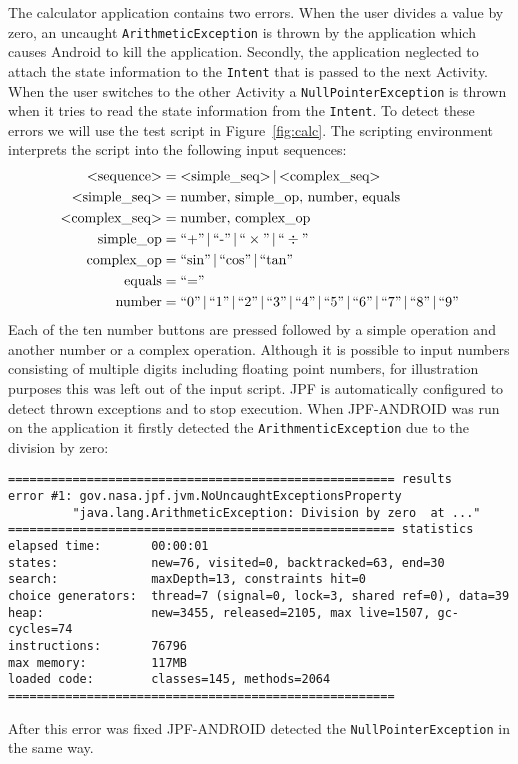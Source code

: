 \documentclass{acm_proc_article-sp}
\begin{document}
The calculator application contains two errors. When the user divides a value by zero, an uncaught
\texttt{ArithmeticException} is thrown by the application which causes Android to kill the application. Secondly, the application neglected
to attach the state information to the \texttt{Intent} that is passed to the next Activity. When the user switches to the other Activity a
\texttt{NullPointerException} is thrown when it tries to read the state information from the \texttt{Intent}. To detect these errors we will use the test script in Figure~\ref{fig:calc}. The scripting environment interprets the script into the
following input sequences:
\begin{align*}
\text{<sequence>} &= \text{<simple\_seq>}\,|\,\text{<complex\_seq>}\\
\text{<simple\_seq>} &= \text{number},\,\text{simple\_op},\,\text{number},\,\text{equals}\\
\text{<complex\_seq>} &= \text{number},\,\text{complex\_op}\\
\text{simple\_op} &= \text{``+''}\,|\,\text{``-''}\,|\,\text{``}\times\text{''}\,|\,\text{``}\div\text{''}\\
\text{complex\_op} &= \text{``sin''}\,|\,\text{``cos''}\,|\,\text{``tan''}\\
\text{equals} &= \text{``=''} \\
\text{number} &= \text{``0''\,|\,``1''\,|\,``2''\,|\,``3''\,|\,``4''\,|\,``5''\,|\,``6''\,|\,``7''\,|\,``8''\,|\,``9''}
\end{align*}
Each of the ten number buttons are pressed followed by a simple operation and another number or a complex operation. Although it is possible
to input numbers consisting of multiple digits including floating point numbers, for illustration purposes this was left out of the input script.
JPF is automatically configured to detect thrown exceptions and to stop execution. When JPF-ANDROID was run on the application it firstly
detected the \texttt{ArithmenticException} due to the division by zero:

\vspace*{-10pt}
\begingroup
 \fontsize{6pt}{7pt}\selectfont
\begin{verbatim}
====================================================== results
error #1: gov.nasa.jpf.jvm.NoUncaughtExceptionsProperty 
         "java.lang.ArithmeticException: Division by zero  at ..."
====================================================== statistics
elapsed time:       00:00:01
states:             new=76, visited=0, backtracked=63, end=30
search:             maxDepth=13, constraints hit=0
choice generators:  thread=7 (signal=0, lock=3, shared ref=0), data=39
heap:               new=3455, released=2105, max live=1507, gc-cycles=74
instructions:       76796
max memory:         117MB
loaded code:        classes=145, methods=2064
======================================================
\end{verbatim}
\endgroup
\vspace*{-10pt}
After this error was fixed JPF-ANDROID detected the \texttt{NullPointerException} in the same way.
\end{document}

